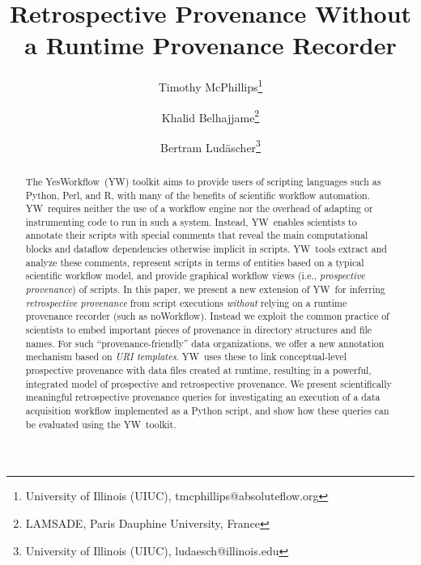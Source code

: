 \documentclass[letterpaper,twocolumn,10pt]{article}
\newcommand{\NW}{\textsf{noWorkflow}}
\newcommand{\YW}{\textsf{YesWorkflow}}
\newcommand{\yw}{\textsf{YW}}
\newcommand{\R}{\textsf{R}}
\newcommand{\MATLAB}{\textsf{MATLAB}}
\begin{document}
\newtheorem{mydef}{Definition}

\date{}

\title{Retrospective Provenance Without a Runtime Provenance Recorder}

\author{
Timothy McPhillips\thanks{University of Illinois (UIUC),
  tmcphillips@absoluteflow.org}
\and  
Khalid Belhajjame\thanks{LAMSADE, Paris Dauphine University, France}
\and 
Bertram Lud\"{a}scher\thanks{University of Illinois (UIUC), ludaesch@illinois.edu}
}

\maketitle

\thispagestyle{empty}

\begin{abstract}
  The \YW\ (\yw) toolkit aims to provide users of scripting languages
  such as Python, Perl, and \R, with many of the benefits of
  scientific workflow automation.  \yw\ requires neither the use of a
  workflow engine nor the overhead of adapting or instrumenting code
  to run %
  in such a system.  Instead, \yw\ enables scientists to annotate
  their scripts with special comments that reveal the main
  computational blocks and dataflow dependencies otherwise implicit in
  scripts.  \yw\ tools extract and analyze these comments, represent
  scripts in terms of entities based on a typical scientific workflow
  model, and provide graphical workflow views (i.e., \emph{prospective
    provenance}) of scripts.
  In this paper, we present a new extension of \yw\ for inferring
  \emph{retrospective provenance} from script executions
  \emph{without} relying on a runtime provenance recorder (such as
  \NW). Instead we exploit the common practice of scientists to embed
  important pieces of provenance in directory structures and file
  names. For such ``provenance-friendly'' data organizations, we offer
  a new annotation mechanism based on \emph{URI templates}. \yw\ uses
  these to link conceptual-level prospective provenance with data
  files created at runtime, resulting in a powerful, integrated model
  of prospective and retrospective provenance.
  We present scientifically meaningful retrospective provenance
  queries for investigating an execution of a data acquisition
  workflow implemented as a Python script, and show how these queries
  can be evaluated using the \yw\ toolkit.
\end{abstract}
\end{document}
